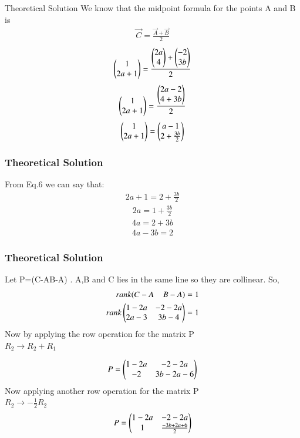 \documentclass{beamer}
\begin{document}
\begin{frame}{Theoretical Solution}
We know that the midpoint formula for the points A and B is
\begin{align}
    \vec{C}=\frac{\vec{A}+\vec{B}}{2}
    \end{align}
\begin{align}
    \myvec{1\\2a+1}=\frac{\myvec{2a\\4}+\myvec{-2\\3b}}{2}
\end{align}
\begin{align}
    \myvec{1\\2a+1}=\frac{\myvec{2a-2\\4+3b}}{2}
\end{align}
\begin{align}
    \myvec{1\\2a+1}=\myvec{a-1\\2+\frac{3b}{2}}
\end{align}

\end{frame}
\begin{frame}
\frametitle{Theoretical Solution}
From Eq.6 we can say that:
\begin{align}
    2a+1=2+\frac{3b}{2}
\end{align}
\begin{align}
    2a=1+\frac{3b}{2}
\end{align}
\begin{align}
    4a=2+3b
\end{align}
\begin{align}
    4a-3b=2
\end{align}

\end{frame}
\begin{frame}
\frametitle{Theoretical Solution}

Let P=(C-A\;\;\;B-A) . A,B and C lies in the same line so they are collinear. So,
\begin{align}
   rank(C-A\;\;\;\;B-A )=1\\
   rank\myvec{1-2a&-2-2a\\
   2a-3&3b-4}=1
\end{align}
Now by applying the row operation for the matrix P\\
$R_2\longrightarrow R_2 +R_1$

\begin{align}
    P=\myvec{1-2a&-2-2a\\-2&3b-2a-6}
\end{align}
Now applying another row operation for the matrix P\\
$R_2\longrightarrow-\frac{1}{2}R_2$
\begin{align}
    P=\myvec{1-2a&-2-2a\\1&\frac{-3b+2a+6}{2}}
\end{align}

\end{frame}
\end{document}
